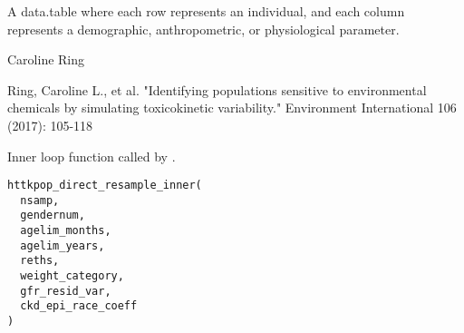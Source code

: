 \documentclass[a4paper]{book}
\begin{document}
%
\begin{Value}
A data.table where each row represents an individual, and each
column represents a demographic, anthropometric, or physiological parameter.
\end{Value}
%
\begin{Author}\relax
Caroline Ring
\end{Author}
%
\begin{References}\relax
Ring, Caroline L., et al. "Identifying populations sensitive to
environmental chemicals by simulating toxicokinetic variability."
Environment International 106 (2017): 105-118
\end{References}
%
\begin{Description}\relax
Inner loop function called by .
\end{Description}
%
\begin{Usage}
\begin{verbatim}
httkpop_direct_resample_inner(
  nsamp,
  gendernum,
  agelim_months,
  agelim_years,
  reths,
  weight_category,
  gfr_resid_var,
  ckd_epi_race_coeff
)
\end{verbatim}
\end{Usage}
%
\end{document}
